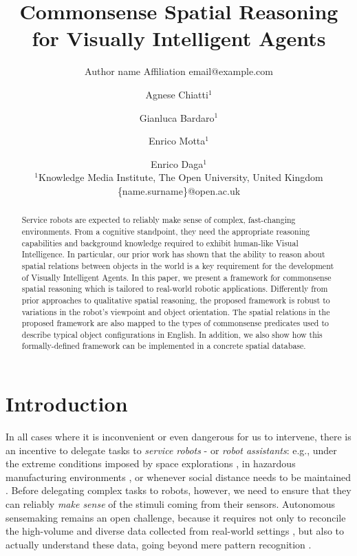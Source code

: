 \documentclass{article}
\title{Commonsense Spatial Reasoning for Visually Intelligent Agents}
\author{%
    Author name
    \affiliations
    Affiliation
    \emails
   email@example.com    %
}
\author{%
Agnese Chiatti$^1$\and
Gianluca Bardaro$^1$\and
Enrico Motta$^1$\and
Enrico Daga$^1$ \\
\affiliations
$^1$Knowledge Media Institute, The Open University, United Kingdom\\

\emails
\{name.surname\}@open.ac.uk
}
\begin{document}
\maketitle

\begin{abstract}
Service robots are expected to reliably make sense of complex, fast-changing environments. From a cognitive standpoint, they need the appropriate reasoning capabilities and background knowledge required to exhibit human-like Visual Intelligence. In particular, our prior work has shown that the ability to reason about spatial relations between objects in the world is a key requirement for the development of Visually Intelligent Agents. In this paper, we present a framework for commonsense spatial reasoning which is tailored to real-world robotic applications. Differently from prior approaches to qualitative spatial reasoning, the proposed framework is robust to variations in the robot's viewpoint and object orientation. The spatial relations in the proposed framework are also mapped to the types of commonsense predicates used to describe typical object configurations in English. In addition, we also show how this formally-defined framework can be implemented in a concrete spatial database. 
\end{abstract}

\section{Introduction}
 In all cases where it is inconvenient or even dangerous for us to intervene, there is an incentive to delegate tasks to \textit{service robots} - or \textit{robot assistants}: e.g., under the extreme conditions imposed by space explorations \cite{nilsson2018toward}, in hazardous manufacturing environments \cite{liu2020remote}, or whenever social distance needs to be maintained \cite{yang2020keep}. Before delegating complex tasks to robots, however, we need to ensure that they can reliably \textit{make sense} of the stimuli coming from their sensors. Autonomous sensemaking remains an open challenge, because it requires not only to reconcile the high-volume and diverse data collected from real-world settings \cite{alatise2020review}, but also to actually understand these data, going beyond mere pattern recognition \cite{lake_building_2017,davis_commonsense_2015}. 
\end{document}
